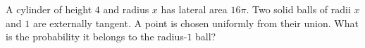 A cylinder of height $4$ and radius $x$ has lateral area $16\pi$. Two solid balls of radii $x$ and $1$ are externally tangent. A point is chosen uniformly from their union. What is the probability it belongs to the radius-$1$ ball?
